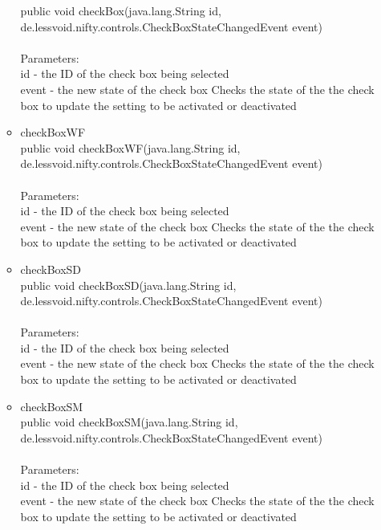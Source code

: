 \documentclass[letterpaper]{article}
\begin{document}
\begin{itemize}
\begin{itemize}
															public void checkBox(java.lang.String id, \\
						            de.lessvoid.nifty.controls.CheckBoxStateChangedEvent event) \\ \\
															Parameters: \\
															id - the ID of the check box being selected \\
															event - the new state of the check box Checks the state of the the check box to update the setting to be activated or deactivated
													\item	checkBoxWF \\
															public void checkBoxWF(java.lang.String id, \\
						              de.lessvoid.nifty.controls.CheckBoxStateChangedEvent event) \\ \\
															Parameters: \\
															id - the ID of the check box being selected \\
															event - the new state of the check box Checks the state of the the check box to update the setting to be activated or deactivated
													\item	checkBoxSD \\
															public void checkBoxSD(java.lang.String id, \\
						              de.lessvoid.nifty.controls.CheckBoxStateChangedEvent event) \\ \\
															Parameters: \\
															id - the ID of the check box being selected \\
															event - the new state of the check box Checks the state of the the check box to update the setting to be activated or deactivated
													\item	checkBoxSM \\
															public void checkBoxSM(java.lang.String id, \\
						              de.lessvoid.nifty.controls.CheckBoxStateChangedEvent event) \\ \\
															Parameters: \\
															id - the ID of the check box being selected \\
															event - the new state of the check box Checks the state of the the check box to update the setting to be activated or deactivated

\end{itemize}
\end{itemize}
\end{document}
